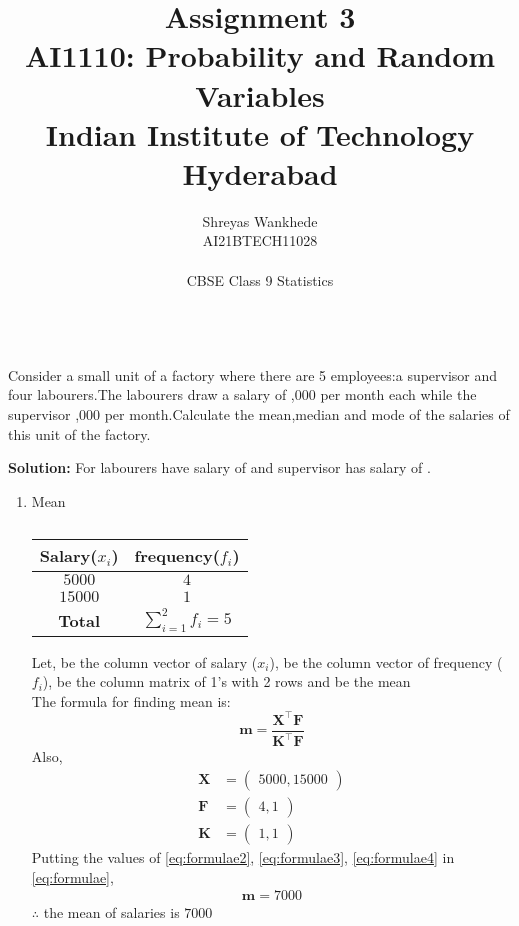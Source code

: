 \documentclass[journal,12pt, two column]{IEEEtran}
\title{Assignment 3\\ \Large AI1110: Probability and Random Variables \\ \large Indian Institute of Technology Hyderabad}
\author{Shreyas Wankhede \\ \normalsize AI21BTECH11028 \\ \vspace*{20pt} \\ \Large CBSE Class 9 Statistics}
\let\vec\mathbf
\newcommand{\myvec}[1]{\ensuremath{\begin{pmatrix}#1\end{pmatrix}}}
\begin{document}
\\
Consider a small unit of a factory where there are 5 employees:a supervisor and four labourers.The labourers draw a salary of ,000 per month each while the supervisor ,000 per month.Calculate the mean,median and mode of the salaries of this unit of the factory.

\textbf{Solution:}
For labourers have salary of  and supervisor has salary of .

\begin{enumerate}[label=(\roman*)]

\item
Mean
\begin{table}[!ht]
            \centering
            \resizebox{\columnwidth}{!}
            {
                \begin{tabular}{|c| c| }
                \hline
                 Salary($x_{i}$) & frequency($f_{i}$) \\
                 \hline
                 $5000$   & $4$ \\
                 $15000$   & $1$ \\
                 \hline
                    \textbf{Total} & $\sum_{i=1}^{2} f_{i} = 5$ \\
                 \hline
                \end{tabular}
            }
            \caption{}
            \label{table:table1}
       \end{table}
       
Let, \vec{X} be the column vector of salary ($x_{i}$), \vec{F} be the column vector of frequency ($f_{i}$), \vec{K} be the column matrix of 1's with 2 rows and \vec{m} be the mean\\
The formula for finding mean is:
\begin{equation}
 \label{eq:formulae}
 \vec{m} =\dfrac{\vec{X^{\top}}\vec{F}}{\vec{K^{\top}}\vec{F}} 
\end{equation}
Also,
\begin{align}
 \label{eq:formulae2}
	      	\vec{X}&=\myvec{5000,15000}   \\
	     \label{eq:formulae3}
	      	\vec{F}&=\myvec{4,1}    \\
	     \label{eq:formulae4}
      		\vec{K}&=\myvec{1,1}   
\end{align}
Putting the values of \eqref{eq:formulae2}, \eqref{eq:formulae3}, \eqref{eq:formulae4} in \eqref{eq:formulae},
\begin{align}
 \vec{m} = 7000
\end{align}
 $\therefore$ the mean of salaries is \rupee$7000$



\end{enumerate}
\end{document}
